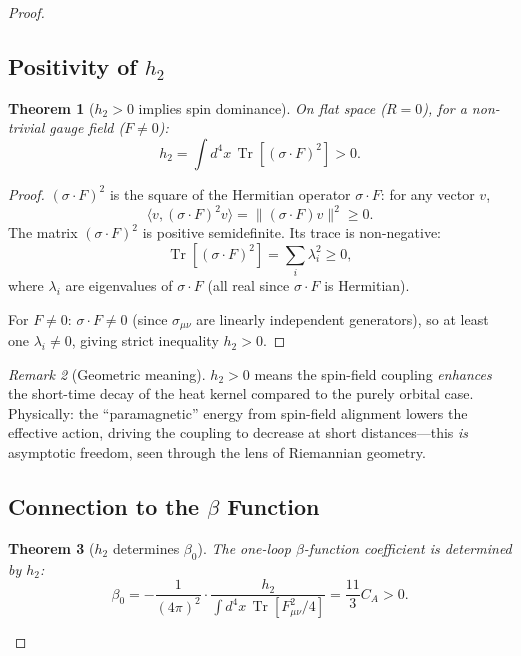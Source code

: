 \documentclass[12pt,a4paper]{article}
\theoremstyle{plain}
\newtheorem{theorem}{Theorem}[section]
\theoremstyle{definition}
\theoremstyle{remark}
\newtheorem{remark}[theorem]{Remark}
\begin{document}
\begin{proof}
\subsection{Positivity of $h_2$}\label{sec:h2pos}

\begin{theorem}[$h_2>0$ implies spin dominance]\label{thm:h2pos}
On flat space ($R=0$), for a non-trivial gauge field ($F\neq 0$):
\begin{equation}\label{eq:h2flat}
h_2 = \int d^4x\,\operatorname{Tr}[(\sigma\cdot F)^2] > 0.
\end{equation}
\end{theorem}

\begin{proof}
$(\sigma\cdot F)^2$ is the square of the Hermitian operator $\sigma\cdot F$: for any vector $v$,
\begin{equation}\label{eq:sigmaFsq}
\langle v,(\sigma\cdot F)^2 v\rangle = \|(\sigma\cdot F)v\|^2 \geq 0.
\end{equation}
The matrix $(\sigma\cdot F)^2$ is positive semidefinite. Its trace is non-negative:
\begin{equation}\label{eq:trh2}
\operatorname{Tr}[(\sigma\cdot F)^2] = \sum_i \lambda_i^2 \geq 0,
\end{equation}
where $\lambda_i$ are eigenvalues of $\sigma\cdot F$ (all real since $\sigma\cdot F$ is Hermitian).

For $F\neq 0$: $\sigma\cdot F\neq 0$ (since $\sigma_{\mu\nu}$ are linearly independent generators), so at least one $\lambda_i\neq 0$, giving strict inequality $h_2>0$.
\end{proof}

\begin{remark}[Geometric meaning]
$h_2>0$ means the spin-field coupling \emph{enhances} the short-time decay of the heat kernel compared to the purely orbital case. Physically: the ``paramagnetic'' energy from spin-field alignment lowers the effective action, driving the coupling to decrease at short distances---this \emph{is} asymptotic freedom, seen through the lens of Riemannian geometry.
\end{remark}

\subsection{Connection to the $\beta$ Function}\label{sec:h2beta}

\begin{theorem}[$h_2$ determines $\beta_0$]\label{thm:h2beta}
The one-loop $\beta$-function coefficient is determined by $h_2$:
\begin{equation}\label{eq:h2tobeta}
\beta_0 = -\frac{1}{(4\pi)^2}\cdot\frac{h_2}{\int d^4x\,\operatorname{Tr}[F_{\mu\nu}^2/4]} = \frac{11}{3}C_A > 0.
\end{equation}
\end{theorem}


\end{proof}
\end{document}
